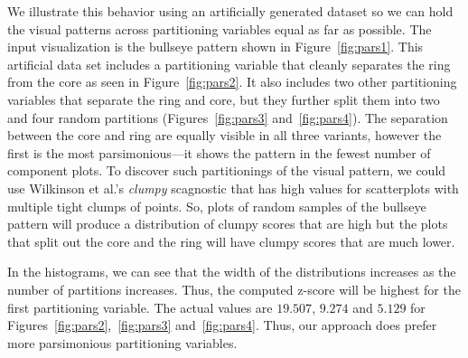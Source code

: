 We illustrate this behavior using an artificially generated dataset so we can hold the visual patterns across partitioning variables equal as far as possible. The input visualization is the bullseye pattern shown in Figure~\ref{fig:pars1}. This artificial data set includes a partitioning variable that cleanly separates the ring from the core as seen in Figure~\ref{fig:pars2}. It also includes two other partitioning variables that separate the ring and core, but they further split them into two and four random partitions (Figures~\ref{fig:pars3} and~\ref{fig:pars4}). The separation between the core and ring are equally visible in all three variants, however the first is the most parsimonious---it shows the pattern in the fewest number of component plots. 
To discover such partitionings of the visual pattern, we could use Wilkinson et al.'s \emph{clumpy} scagnostic that has high values for scatterplots with multiple tight clumps of points. So, plots of random samples of the bullseye pattern will produce a distribution of clumpy scores that are high but the plots that split out the core and the ring will have clumpy scores that are much lower.

In the histograms, we can see that the width of the distributions increases as the number of partitions increases. Thus, the computed z-score will be highest for the first partitioning variable. The actual values are $19.507$, $9.274$ and $5.129$ for Figures~\ref{fig:pars2},~\ref{fig:pars3} and~\ref{fig:pars4}. Thus, our approach does prefer more parsimonious partitioning variables.

